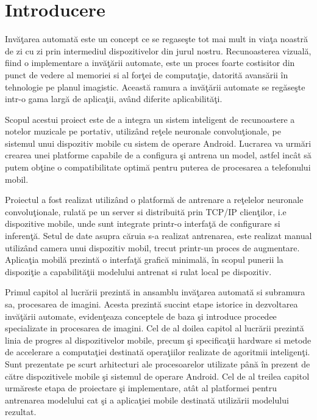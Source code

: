 \chapter{Introducere}

Invăţarea automată este un concept ce se regaseşte tot mai mult in viaţa noastră de zi cu zi prin intermediul dispozitivelor din jurul nostru. Recunoasterea vizuală, fiind o implementare a invăţării automate, este un proces foarte costisitor din punct de vedere al memoriei si al forţei de computaţie, datorită avansării în tehnologie pe planul imagistic. Această ramura a invăţării automate se regăseşte intr-o gama largă de aplicaţii, având diferite aplicabilităţi.  \newline

Scopul acestui proiect este de a integra un sistem inteligent de recunoastere a notelor muzicale pe portativ, utilizând reţele neuronale convoluţionale, pe sistemul unui dispozitiv mobile cu sistem de operare Android. Lucrarea va urmări crearea unei platforme capabile de a configura şi antrena un model, astfel incât să putem obţine o compatibilitate optimă pentru puterea de procesarea a telefonului mobil.\newline

Proiectul a fost realizat utilizând o platformă de antrenare a reţelelor neuronale convoluţionale, rulată pe un server si distribuită prin TCP/IP clienţilor, i.e dispozitive mobile, unde sunt integrate printr-o interfaţă de configurare si inferenţă. Setul de date asupra căruia s-a realizat antrenarea, este realizat manual utilizând camera unui dispozitiv mobil, trecut printr-un proces de augmentare. 
Aplicaţia mobilă prezintă o interfaţă grafică minimală, în scopul punerii la dispoziţie a capabilităţii modelului antrenat si rulat local pe dispozitiv.\newline

Primul capitol al lucrării prezintă in ansamblu invăţarea automată si subramura sa, procesarea de imagini. Acesta prezintă succint etape istorice in dezvoltarea invăţării automate, evidenţeaza conceptele de baza şi introduce procedee specializate in procesarea de imagini.
Cel de al doilea capitol al lucrării prezintă linia de progres al dispozitivelor mobile, precum şi specificaţii hardware si metode de accelerare a computaţiei destinată operaţiilor realizate de agoritmii inteligenţi. Sunt prezentate pe scurt arhitecturi ale procesoarelor utilizate până în prezent de către dispozitivele mobile şi sistemul de operare Android.
Cel de al treilea capitol urmăreste etapa de proiectare şi implementare, atât al platformei pentru antrenarea modelului cat şi a aplicaţiei mobile destinată utilizării modelului rezultat.